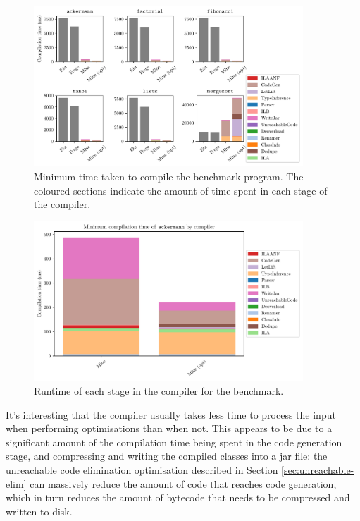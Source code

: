 \documentclass[dissertation.tex]{subfiles}
\begin{document}
{{        \begin{figure}[h]
            \centering
            \captionsetup{width=0.8\textwidth}
            \includegraphics[width=0.9\textwidth]{graphs/compiler_perf.pdf}
            \caption{Minimum time taken to compile the benchmark program. The coloured sections indicate the amount of time spent in each stage of the compiler.}
            \label{fig:compiler-perf}
        \end{figure}
        \begin{figure}[h]
            \centering
            \captionsetup{width=0.8\textwidth}
            \includegraphics[width=0.9\textwidth]{graphs/compiler_perf_mine_ackermann.pdf}
            \caption{Runtime of each stage in the compiler for the  benchmark.}
            \label{fig:compiler-perf-ackermann}
        \end{figure}

        It's interesting that the compiler usually takes less time to process the input when performing optimisations than when not. This appears to be due to a significant amount of the compilation time being spent in the code generation stage, and compressing and writing the compiled classes into a jar file: the unreachable code elimination optimisation described in Section \ref{sec:unreachable-elim} can massively reduce the amount of code that reaches code generation, which in turn reduces the amount of bytecode that needs to be compressed and written to disk.
    }
}
\end{document}
